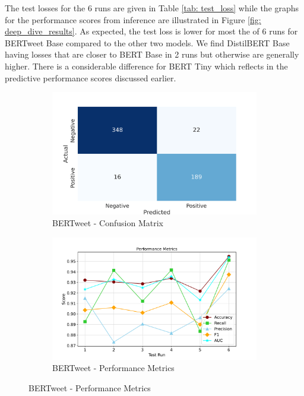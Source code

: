 The test losses for the 6 runs are given in Table \ref{tab: test_loss} while the graphs for the performance scores from inference are illustrated in Figure \ref{fig: deep_dive_results}. As expected, the test loss is lower for most the of 6 runs for BERTweet Base compared to the other two models. We find DistilBERT Base having losses that are closer to BERT Base in 2 runs but otherwise are generally higher. There is a considerable difference for BERT Tiny which reflects in the predictive performance scores discussed earlier. 
\begin{figure}[!ht]
    \small
    \centering
    \begin{subfigure}{0.45\linewidth}
        \includegraphics[width=\linewidth]{figures/confusion_bertweet.png}
        \caption{BERTweet - Confusion Matrix}
    \end{subfigure}
    \hfil
    \begin{subfigure}{0.45\linewidth}
        \includegraphics[width=\linewidth]{figures/metrics_line_bertweet.pdf}
        \caption{BERTweet - Performance Metrics}
    \end{subfigure}


\end{figure}
